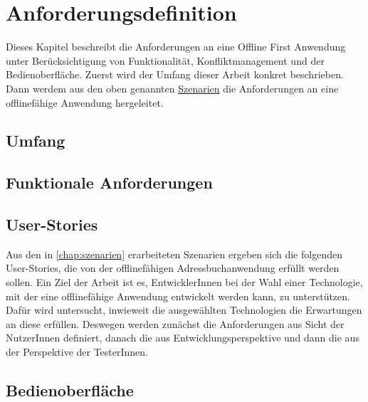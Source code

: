 \chapter{\label{chap:anforderungen}Anforderungsdefinition}
Dieses Kapitel beschreibt die Anforderungen an eine Offline First Anwendung unter Berücksichtigung von Funktionalität, Konfliktmanagement und der Bedienoberfläche.
Zuerst wird der Umfang dieser Arbeit konkret beschrieben. Dann werdem aus den oben genannten \hyperref[chap:szenarien]{Szenarien} die Anforderungen an eine offlinefähige Anwendung hergeleitet.
%
%
\section{Umfang}

%
%
\section{\label{chap:funktionaleanforderungen}Funktionale Anforderungen}

%
%
\section{User-Stories}
Aus den in \autoref{chap:szenarien} erarbeiteten Szenarien ergeben sich die folgenden User-Stories, die von der offlinefähigen Adressbuchanwendung erfüllt werden sollen.
Ein Ziel der Arbeit ist es, EntwicklerInnen bei der Wahl einer Technologie, mit der eine offlinefähige Anwendung entwickelt werden kann, zu unterstützen. Dafür wird untersucht, inwieweit die ausgewählten Technologien die Erwartungen an diese erfüllen.
Deswegen werden zunächst die Anforderungen aus Sicht der NutzerInnen definiert, danach die aus Entwicklungsperspektive und dann die aus der Perspektive der TesterInnen.



%
%
\section{Bedienoberfläche}
